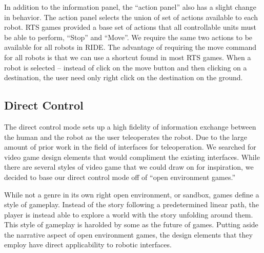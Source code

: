 In addition to the information panel, the ``action panel'' also has a slight change in behavior. The action panel selects the union of set of actions available to each robot. RTS games provided a base set of actions that all controllable units must be able to perform, ``Stop'' and ``Move''. We require the same two actions to be available for all robots in RIDE. The advantage of requiring the move command for all robots is that we can use a shortcut found in most RTS games. When a robot is selected -- instead of click on the move button and then clicking on a destination, the user need only right click on the destination on the ground.


% 
% 
% 
% 

\subsection{Direct Control}

The direct control mode sets up a high fidelity of information exchange between the human and the robot as the user teleoperates the robot. Due to the large amount of prior work in the field of interfaces for teleoperation. We searched for video game design elements that would compliment the existing interfaces. While there are several styles of video game that we could draw on for inspiration, we decided to base our direct control mode off of ``open environment games.''

While not a genre in its own right open environment, or sandbox, games define a style of gameplay. Instead of the story following a predetermined linear path, the player is instead able to explore a world with the story unfolding around them. This style of gameplay is harolded by some as the future of games. Putting aside the narrative aspect of open environment games, the design elements that they employ have direct applicability to robotic interfaces.

